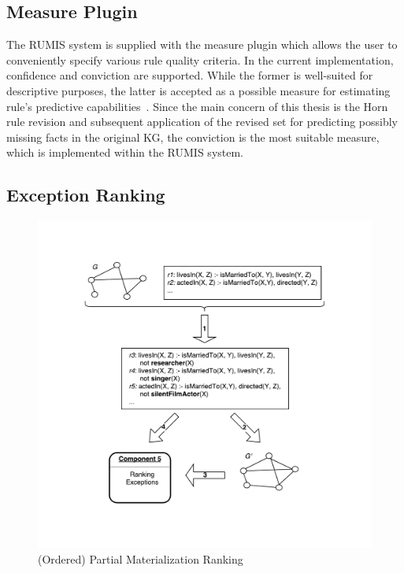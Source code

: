 \subsection{Measure Plugin}

The RUMIS system is supplied with the measure plugin which allows the user to conveniently specify various rule quality criteria. In the current implementation, confidence and conviction are supported. While the former is well-suited for descriptive purposes, the latter is accepted as a possible measure for estimating rule's predictive capabilities~\cite{ref46}. Since the main concern of this thesis is the Horn rule revision and subsequent application of the revised set for predicting possibly missing facts in the original KG, the conviction is the most suitable measure, which is implemented within the RUMIS system.

\subsection{Exception Ranking}
\label{intuition_er}

\begin{figure}[t]
\centering
\includegraphics[width=1.0\textwidth]{figures/ranking}
\caption{(Ordered) Partial Materialization Ranking}
\label{pm_ranking}
\end{figure}

